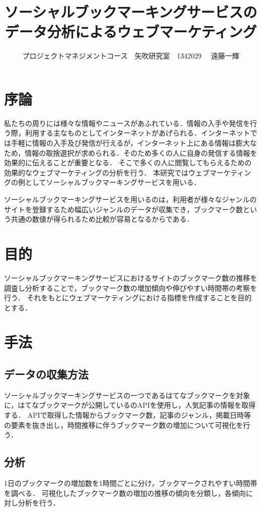 \documentclass[uplatex,twocolumn,dvipdfmx]{jsarticle}
\title{\vspace{-5mm}\fontsize{14pt}{0pt}\selectfont ソーシャルブックマーキングサービスのデータ分析によるウェブマーケティング}
\author{\normalsize プロジェクトマネジメントコース　矢吹研究室　1342029 　遠藤一輝}
\date{}
\begin{document}
\fontsize{10.5pt}{\baselineskip}\selectfont
\maketitle





\section{序論}
私たちの周りには様々な情報やニュースがあふれている．情報の入手や発信を行う際，利用する主なものとしてインターネットがあげられる．インターネットでは手軽に情報の入手及び発信が行えるが，インターネット上にある情報は膨大なため，情報の取捨選択が求められる．そのため多くの人に自身の発信する情報を効果的に伝えることが重要となる．
そこで多くの人に閲覧してもらえるための効果的なウェブマーケティングの分析を行う．
本研究ではウェブマーケティングの例としてソーシャルブックマーキングサービスを用いる．\par
ソーシャルブックマーキングサービスを用いるのは，利用者が様々なジャンルのサイトを登録するため幅広いジャンルのデータが収集でき，ブックマーク数という共通の数値が得られるため比較が容易となるからである．

\section{目的}
ソーシャルブックマーキングサービスにおけるサイトのブックマーク数の推移を調査し分析することで，ブックマーク数の増加傾向や伸びやすい時間帯の考察を行う．
それをもとにウェブマーケティングにおける指標を作成することを目的とする．


\section{手法}

\subsection{データの収集方法}
ソーシャルブックマーキングサービスの一つであるはてなブックマークを対象に，はてなブックマークが公開しているのAPI\cite{hatena}を使用し，人気記事の情報を取得する．
APIで取得した情報からブックマーク数，記事のジャンル，掲載日時等の要素を抜き出し，時間推移に伴うブックマーク数の増加について可視化を行う．

\subsection{分析}
1日のブックマークの増加数を1時間ごとに分け，ブックマークされやすい時間帯を調べる．
可視化したブックマーク数の増加の推移の傾向を分類し，各傾向に対し分析を行う．
\end{document}
